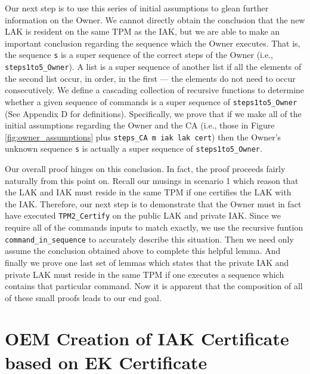 Our next step is to use this series of initial assumptions to glean further information on the Owner. We cannot directly obtain the conclusion that the new LAK is resident on the same TPM as the IAK, but we are able to make an important conclusion regarding the sequence which the Owner executes. That is, the sequence \verb|s| is a super sequence of the correct steps of the Owner (i.e., \verb|steps1to5_Owner|). A list is a super sequence of another list if all the elements of the second list occur, in order, in the first --- the elements do not need to occur consecutively. We define a cascading collection of recursive functions to determine whether a given sequence of commands is a super sequence of \verb|steps1to5_Owner| (See Appendix D for definitions). Specifically, we prove that if we make all of the initial assumptions regarding the Owner and the CA (i.e., those in Figure \ref{fig:owner_assumptions} plus \verb|steps_CA m iak lak cert|) then the Owner's unknown sequence \verb|s| is actually a super sequence of \verb|steps1to5_Owner|. 

Our overall proof hinges on this conclusion. In fact, the proof proceeds fairly naturally from this point on. Recall our musings in scenario 1 which reason that the LAK and IAK must reside in the same TPM if one certifies the LAK with the IAK. Therefore, our next step is to demonstrate that the Owner must in fact have executed \verb|TPM2_Certify| on the public LAK and private IAK. Since we require all of the commands inputs to match exactly, we use the recursive funtion \verb|command_in_sequence| to accurately describe this situation. Then we need only assume the conclusion obtained above to complete this helpful lemma. And finally we prove one last set of lemmas which states that the private IAK and private LAK must reside in the same TPM if one executes a sequence which contains that particular command.
Now it is apparent that the composition of all of these small proofs leads to our end goal.




\newpage
\section{OEM Creation of IAK Certificate based on EK Certificate}


